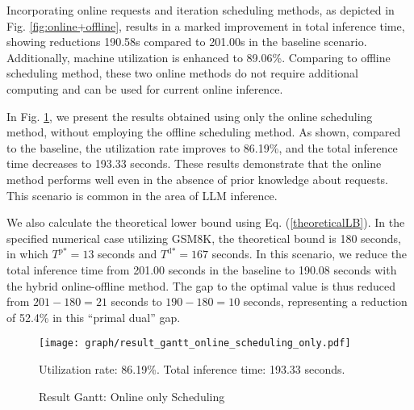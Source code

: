 Incorporating online requests and iteration scheduling methods, as depicted in Fig. \ref{fig:online+offline}, results in a marked improvement in total inference time, showing reductions 190.58s compared to 201.00s in the baseline scenario. Additionally, machine utilization is enhanced to 89.06\%. Comparing to offline scheduling method, these two online methods do not require additional computing and can be used for current online inference.

In Fig. \ref{fig:online_only}, we present the results obtained using only the online scheduling method, without employing the offline scheduling method. As shown, compared to the baseline, the utilization rate improves to 86.19\%, and the total inference time decreases to 193.33 seconds. These results demonstrate that the online method performs well even in the absence of prior knowledge about requests. This scenario is common in the area of LLM inference.

We also calculate the theoretical lower bound using Eq. (\ref{theoreticalLB}). In the specified numerical case utilizing GSM8K, the theoretical bound is 180 seconds, in which $T^{\text{p}*}=13$ seconds and $T^{\text{d}*}=167$ seconds. In this scenario, we reduce the total inference time from 201.00 seconds in the baseline to 190.08 seconds with the hybrid online-offline method. The gap to the optimal value is thus reduced from \(201 - 180 = 21\) seconds to \(190 - 180 = 10\) seconds, representing a reduction of 52.4\% in this ``primal dual'' gap.


\begin{figure}
    \centering
    \texttt{[image: graph/result\_gantt\_online\_scheduling\_only.pdf]}
    \begin{flushleft}
    \vspace{-2em}
    \caption*{Utilization rate: 86.19\%. Total inference time: 193.33 seconds.}
    \end{flushleft}
    \vspace{-2em}
    \caption{Result Gantt: Online only Scheduling}
    \label{fig:online_only}
\end{figure}


